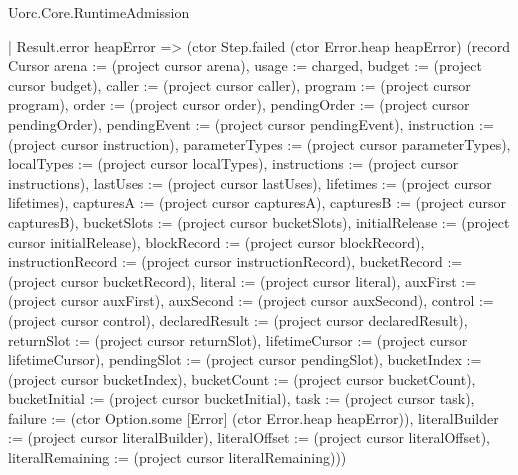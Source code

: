 \begin{lexlean}{Uorc.Core.RuntimeAdmission}
\begin{semanticmodule}
{        | Result.error heapError => (ctor Step.failed (ctor Error.heap heapError) (record Cursor {arena := (project cursor arena), usage := charged, budget := (project cursor budget), caller := (project cursor caller), program := (project cursor program), order := (project cursor order), pendingOrder := (project cursor pendingOrder), pendingEvent := (project cursor pendingEvent), instruction := (project cursor instruction), parameterTypes := (project cursor parameterTypes), localTypes := (project cursor localTypes), instructions := (project cursor instructions), lastUses := (project cursor lastUses), lifetimes := (project cursor lifetimes), capturesA := (project cursor capturesA), capturesB := (project cursor capturesB), bucketSlots := (project cursor bucketSlots), initialRelease := (project cursor initialRelease), blockRecord := (project cursor blockRecord), instructionRecord := (project cursor instructionRecord), bucketRecord := (project cursor bucketRecord), literal := (project cursor literal), auxFirst := (project cursor auxFirst), auxSecond := (project cursor auxSecond), control := (project cursor control), declaredResult := (project cursor declaredResult), returnSlot := (project cursor returnSlot), lifetimeCursor := (project cursor lifetimeCursor), pendingSlot := (project cursor pendingSlot), bucketIndex := (project cursor bucketIndex), bucketCount := (project cursor bucketCount), bucketInitial := (project cursor bucketInitial), task := (project cursor task), failure := (ctor Option.some [Error] (ctor Error.heap heapError)), literalBuilder := (project cursor literalBuilder), literalOffset := (project cursor literalOffset), literalRemaining := (project cursor literalRemaining)}))
}
\end{semanticmodule}
\end{lexlean}
